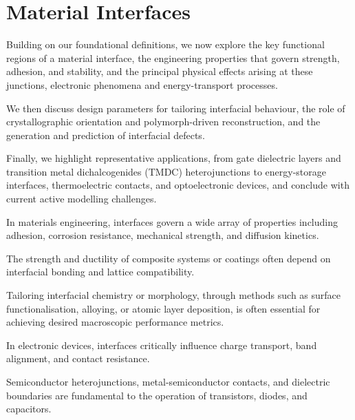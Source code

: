 \section{Material Interfaces} \label{section:material_interfaces}

\label{para:interface_section_intro} %

Building on our foundational definitions, we now explore the key functional regions of a material interface, the
engineering properties that govern strength, adhesion, and stability, and the principal physical effects arising at
these junctions, electronic phenomena and energy-transport processes.

We then discuss design parameters for tailoring interfacial behaviour, the role of crystallographic orientation and
polymorph-driven reconstruction, and the generation and prediction of interfacial defects.

Finally, we highlight representative applications, from gate dielectric layers and transition metal dichalcogenides
(TMDC) heterojunctions to energy-storage interfaces, thermoelectric contacts, and optoelectronic devices, and conclude
with current active modelling challenges.

\label{para:interfacial_engineering_properties} %

In materials engineering, interfaces govern a wide array of properties including adhesion, corrosion resistance,
mechanical strength, and diffusion kinetics\cite{Leitherer2023-ew, Butler2019-ws}.

The strength and ductility of composite systems or coatings often depend on interfacial bonding and lattice
compatibility\cite{Lorentzon2025-si, Raabe2020-ra}.

Tailoring interfacial chemistry or morphology, through methods such as surface functionalisation, alloying, or atomic
layer deposition, is often essential for achieving desired macroscopic performance metrics\cite{Chagarov2015-ol, Leitherer2023-ew, Butler2019-ws}.

\label{para:electronic_interface_effects} %

In electronic devices, interfaces critically influence charge transport, band alignment, and contact resistance\cite{Schusteritsch2015-lw, Leung2020-tv, Low2025-on}.

Semiconductor heterojunctions, metal-semiconductor contacts, and dielectric boundaries are fundamental to the operation
of transistors, diodes, and capacitors\cite{Low2025-on, Khot2025-hh}.

